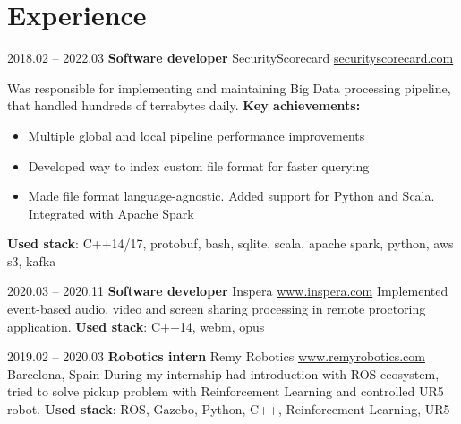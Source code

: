 \documentclass[11pt,a4paper]{moderncv}
\newcommand{\EngRus}[2]{#1}
\newcommand{\SunshinePalace}{\EngRus{Barcelona, Spain}{Барселона, Испания}}
\newcommand{\UsedStack}{\textbf{\EngRus{Used stack}{Используемый Стек}}: }
\newcommand{\WorkDate}[4]{\small{\EngRus{#2.#1 -- #4.#3}{#1.#2 -- #3.#4}}}
\begin{document}
\maketitle
\section{\EngRus{Experience}{Опыт}}
\cventry
  {\WorkDate{02}{2018}{03}{2022}}
  {\bfseries \EngRus{Software developer}{Разработчик ПО}}
  {SecurityScorecard \url{securityscorecard.com}}{}{}
  {
    \EngRus{Was responsible for implementing and maintaining Big Data processing pipeline, that handled hundreds of terrabytes daily.}
    {Разрабатывал и поддерживал пайплайн для больших данных, который обрабатывал сотни террабайт в день.}
    \newline{}\textbf{\EngRus{Key achievements}{Ключевые достижения}:}
    \begin{itemize}
      \item \EngRus{Multiple global and local pipeline performance improvements}{Множественные глобальные и локальные улучшения производительности пайплайна}
      \item \EngRus{Developed way to index custom file format for faster querying}{Реализовал индексацию файлов для быстрого поиска интересующих событий}
      \item \EngRus{Made file format language-agnostic. Added support for Python and Scala. Integrated with Apache Spark}
                   {Упростил формат файла, добавил поддержку Python и Scala. Интегрировал формат с Apache Spark}
    \end{itemize}
    \UsedStack{} C++14/17, protobuf, bash, sqlite, scala, apache spark, python, aws s3, kafka
  }

\cventry
  {\WorkDate{03}{2020}{11}{2020}}
  {\bfseries \EngRus{Software developer}{Разработчик ПО}}
  {Inspera \url{www.inspera.com}}{}{}
  {
    \EngRus{Implemented event-based audio, video and screen sharing processing in remote proctoring application.}
    {Реализовывал событийную обработку аудио, видео в приложении удалённого тестирования.}
    \newline{}\UsedStack{} C++14, webm, opus
  }

\cventry
  {\WorkDate{02}{2019}{03}{2020}}
  {\bfseries \EngRus{Robotics intern}{Стажёр робототехники}}
  {Remy Robotics \url{www.remyrobotics.com}} { \SunshinePalace }{}
  {\EngRus{During my internship had introduction with ROS ecosystem, tried to solve pickup problem with Reinforcement Learning and controlled UR5 robot.}
  {Во время стажировки познакомился с экосистемой ROS, использовал обучение с подкреплением для решения задачи захвата объектов и управлял роботом UR5.}
    \newline{}\UsedStack{} ROS, Gazebo, Python, C++, \EngRus{Reinforcement Learning}{Обучение с подкреплением}, UR5}
\end{document}

